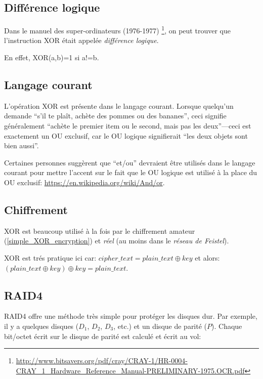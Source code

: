 ﻿
\label{XOR_property}



\subsection{Différence logique}

Dans le manuel des super-ordinateurs (1976-1977)
\footnote{\url{http://www.bitsavers.org/pdf/cray/CRAY-1/HR-0004-CRAY_1_Hardware_Reference_Manual-PRELIMINARY-1975.OCR.pdf}},
on peut trouver que l'instruction XOR était appelée \emph{différence logique}.

En effet, XOR(a,b)=1 si a!=b.

\subsection{Langage courant}

L'opération XOR est présente dans le langage courant.
Lorsque quelqu'un demande ``s'il te plaît, achète des pommes ou des bananes'', ceci
signifie généralement ``achète le premier item ou le second, mais pas les deux''---ceci
est exactement un OU exclusif, car le OU logique signifierait ``les deux objets sont bien aussi''.

Certaines personnes suggèrent que ``et/ou'' devraient être utilisés dans le langage
courant pour mettre l'accent sur le fait que le OU logique est utilisé à la place
du OU exclusif: \url{https://en.wikipedia.org/wiki/And/or}.

\subsection{Chiffrement}

XOR est beaucoup utilisé à la fois par le chiffrement amateur (\ref{simple_XOR_encryption})
et \emph{réel} (au moins dans le \emph{réseau de Feistel}).

XOR est trés pratique ici car:
$cipher\_text = plain\_text \oplus key$ et alors:
$(plain\_text \oplus key) \oplus key = plain\_text$.

\subsection{\ac{RAID}4}

\ac{RAID}4 offre une méthode très simple pour protéger les disques dur.
Par exemple, il y a quelques disques ($D_1$, $D_2$, $D_3$, etc.) et un disque de
parité ($P$).
Chaque bit/octet écrit sur le disque de parité est calculé et écrit au vol:

